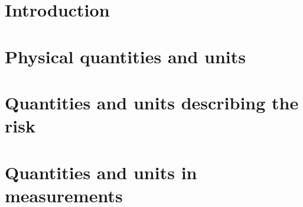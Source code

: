 \section{Introduction}
\section{Physical quantities and units}
\section{Quantities and units describing the risk}
\section{Quantities and units in measurements}